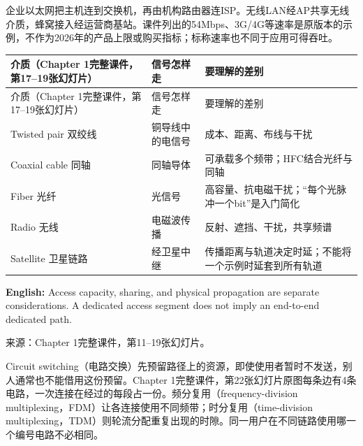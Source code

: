 

企业以太网把主机连到交换机，再由机构路由器连ISP。无线LAN经AP共享无线介质，蜂窝接入经运营商基站。课件列出的54Mbps、3G/4G等速率是原版本的示例，不作为2026年的产品上限或购买指标；标称速率也不同于应用可得吞吐。


\begingroup
\small\setlength{\tabcolsep}{3pt}
\renewcommand{\arraystretch}{1.22}
\begin{longtable}{@{}>{\raggedright\arraybackslash}p{}>{\raggedright\arraybackslash}p{}>{\raggedright\arraybackslash}p{}@{}}
\toprule
介质（Chapter 1完整课件，第17–19张幻灯片） & 信号怎样走 & 要理解的差别 \\
\midrule\endfirsthead
介质（Chapter 1完整课件，第17–19张幻灯片） & 信号怎样走 & 要理解的差别 \\
\midrule\endhead
\bottomrule\endfoot
Twisted pair 双绞线 & 铜导线中的电信号 & 成本、距离、布线与干扰 \\
Coaxial cable 同轴 & 同轴导体 & 可承载多个频带；HFC结合光纤与同轴 \\
Fiber 光纤 & 光信号 & 高容量、抗电磁干扰；“每个光脉冲一个bit”是入门简化 \\
Radio 无线 & 电磁波传播 & 反射、遮挡、干扰，共享频谱 \\
Satellite 卫星链路 & 经卫星中继 & 传播距离与轨道决定时延；不能将一个示例时延套到所有轨道 \\
\end{longtable}
\endgroup


\textbf{English:} Access capacity, sharing, and physical propagation are separate considerations. A dedicated access segment does not imply an end-to-end dedicated path.


来源：Chapter 1完整课件，第11–19张幻灯片。








Circuit switching（电路交换）先预留路径上的资源，即使使用者暂时不发送，别人通常也不能借用这份预留。Chapter 1完整课件，第22张幻灯片原图每条边有4条电路，一次连接在经过的每段占一份。频分复用（frequency-division multiplexing，FDM）让各连接使用不同频带；时分复用（time-division multiplexing，TDM）则轮流分配重复出现的时隙。同一用户在不同链路使用哪一个编号电路不必相同。


